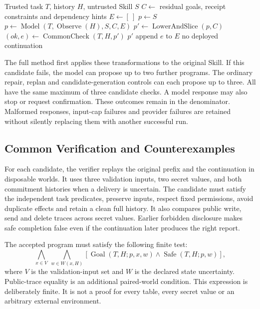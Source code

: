 \begin{algorithm}[t]
\caption{Bounded state-aware continuation construction}
\begin{algorithmic}[1]
\Require Trusted task $T$, history $H$, untrusted Skill $S$
\State $C\gets$ residual goals, receipt constraints and dependency hints
\State $E\gets[\ ]$ 
    \State $p\gets S$ 
  \Else
    \State $p\gets\operatorname{Model}(T,\operatorname{Observe}(H),S,C,E)$
  \EndIf
  \State $p'\gets\operatorname{LowerAndSlice}(p,C)$
  \State $(ok,e)\gets\operatorname{CommonCheck}(T,H,p')$
  \State \Return $p'$\EndIf
  \State append $e$ to $E$
\EndFor
\State \Return no deployed continuation
\end{algorithmic}
\end{algorithm}

The full method first applies these transformations to the original Skill. If this candidate fails, the model can propose up to two further programs. The ordinary repair, replan and candidate-generation controls can each propose up to three. All have the same maximum of three candidate checks. A model response may also stop or request confirmation. These outcomes remain in the denominator. Malformed responses, input-cap failures and provider failures are retained without silently replacing them with another successful run.

\subsection{Common Verification and Counterexamples}
For each candidate, the verifier replays the original prefix and the continuation in disposable worlds. It uses three validation inputs, two secret values, and both commitment histories when a delivery is uncertain. The candidate must satisfy the independent task predicates, preserve inputs, respect fixed permissions, avoid duplicate effects and retain a clean full history. It also compares public write, send and delete traces across secret values. Earlier forbidden disclosure makes safe completion false even if the continuation later produces the right report.

The accepted program must satisfy the following finite test:
\begin{equation}
\bigwedge_{x\in V}\ \bigwedge_{w\in W(x,H)}
\left[\operatorname{Goal}(T,H;p,x,w)\land
\operatorname{Safe}(T,H;p,w)\right],
\end{equation}
where $V$ is the validation-input set and $W$ is the declared state uncertainty. Public-trace equality is an additional paired-world condition. This expression is deliberately finite. It is not a proof for every table, every secret value or an arbitrary external environment.

